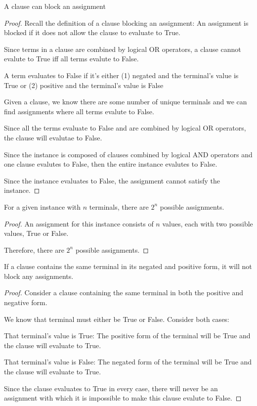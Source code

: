 \documentclass[manuscript]{acmart}
\begin{document}
    \begin{lemma}
        A clause can block an assignment    
    \end{lemma}
    \begin{proof}
        Recall the definition of a clause blocking an assignment:
        An assignment is blocked if it does not allow the clause to evaluate to True.

        Since terms in a clause are combined by logical OR operators, a 
        clause cannot evalute to True iff all terms evalute to False.

        A term evaluates to False if it's either (1) negated and the terminal's
        value is True or (2) positive and the terminal's value is False

        Given a clause, we know there are some number of unique terminals and we can
        find assignments where all terms evalute to False.

        Since all the terms evaluate to False and are combined by logical OR operators, 
        the clause will evalutae to False.

        Since the instance is composed of clauses combined by logical AND operators 
        and one clause evalutes to False, then the entire instance evalutes to False.

        Since the instance evaluates to False, the assignment cannot satisfy
        the instance.
    \end{proof}

    \begin{lemma}        
        For a given instance with $n$ terminals, there are $2^n$ possible assignments.
    \end{lemma}
    \begin{proof}
        An assignment for this instance consists of $n$ values, each with two possible
        values, True or False.

        Therefore, there are $2^n$ possible assignments.
    \end{proof}

    \begin{lemma}
        If a clause contains the same terminal in its negated and positive form, it will
        not block any assignments.
    \end{lemma}
    \begin{proof}

        Consider a clause containing the same terminal in both the positive and
        negative form.

        We know that terminal must either be True or False. Consider both cases:

        That terminal's value is True:
        The positive form of the terminal will be True and the clause will evaluate to True.

        That terminal's value is False:
        The negated form of the terminal will be True and the clause will evaluate to True.

        Since the clause evaluates to True in every case, there will never be an 
        assignment with which it is impossible to make this clause evalute to False.
    \end{proof}
\end{document}
